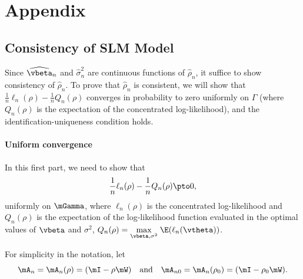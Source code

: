 \section*{Appendix}
\begin{subappendices}

 \section{Consistency of SLM Model}\label{appendix-consistency}

Since $\widehat{\vbeta}_n$ and $\widehat{\sigma}^2_n$ are continuous functions of $\widehat{\rho}_n$, it suffice to show consistency of $\widehat{\rho}_n$. To prove that $\widehat{\rho}_n$ is consistent, we will show that $\frac{1}{n}\ell_n(\rho) - \frac{1}{n}Q_n(\rho)$ converges in probability to zero uniformly on $\Gamma$ (where $Q_n(\rho)$ is the expectation of the concentrated log-likelihood), and the identification-uniqueness condition holds. 

\paragraph{Uniform convergence}

In this first part, we need to show that
\begin{equation*}
  \frac{1}{n}\ell_n(\rho) - \frac{1}{n}Q_n(\rho) \pto 0,
\end{equation*}
%
uniformly on $\mGamma$, where $\ell_n(\rho)$ is the concentrated log-likelihood and $Q_n(\rho)$ is the expectation of the log-likelihood function evaluated in the optimal values of $\vbeta$ and $\sigma^2$, $Q_n(\rho) = \underset{\vbeta, \sigma^2}{\max}\; \E(\ell_n(\vtheta))$.

For simplicity in the notation, let 
\begin{equation*}
 \mA_n = \mA_n(\rho) = (\mI - \rho\mW) \quad \mbox{and} \quad  \mA_{n0} = \mA_n(\rho_0) = (\mI - \rho_0\mW). 
\end{equation*}


\end{subappendices}
